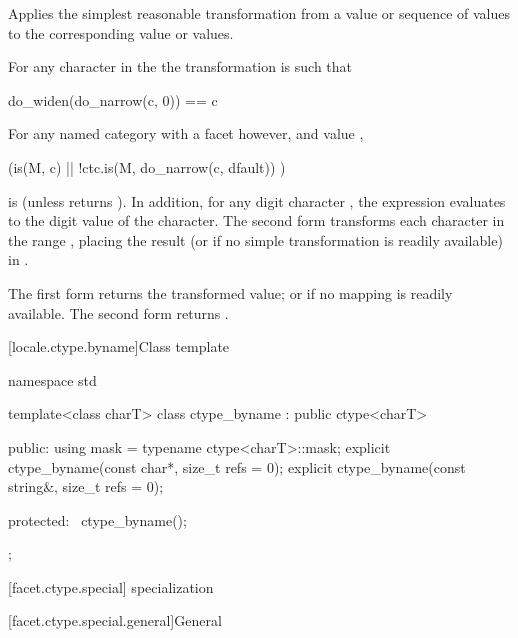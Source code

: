 \begin{itemdescr}
\pnum
\effects
Applies the simplest reasonable transformation
from a  value or sequence of  values
to the corresponding  value or values.

For any character  in the
the transformation is such that
\begin{codeblock}
do_widen(do_narrow(c, 0)) == c
\end{codeblock}

For any named  category with
a  facet  however, and
 value ,
\begin{codeblock}
(is(M, c) || !ctc.is(M, do_narrow(c, dfault)) )
\end{codeblock}
is  (unless  returns ).
In addition, for any digit character ,
the expression 
evaluates to the digit value of the character.
The second form transforms
each character  in the range ,
placing the result
(or  if no simple transformation is readily available)
in .

\pnum
\returns
The first form returns the transformed value;
or  if no mapping is readily available.
The second form returns .
\end{itemdescr}

[locale.ctype.byname]{Class template }

%
\begin{codeblock}
namespace std {
  template<class charT>
    class ctype_byname : public ctype<charT> {
    public:
      using mask = typename ctype<charT>::mask;
      explicit ctype_byname(const char*, size_t refs = 0);
      explicit ctype_byname(const string&, size_t refs = 0);

    protected:
      ~ctype_byname();
    };
}
\end{codeblock}

[facet.ctype.special]{ specialization}

[facet.ctype.special.general]{General}

